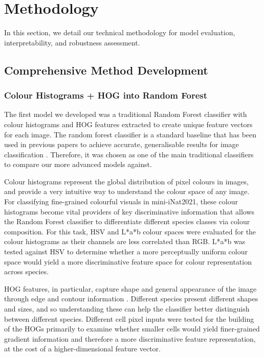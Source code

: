 \section{Methodology}
\label{sec:methods}

In this section, we detail our technical methodology for model evaluation, interpretability, and robustness assessment.

\subsection{Comprehensive Method Development}
\label{sec:comp-method}

\subsubsection{Colour Histograms + HOG into Random Forest}
The first model we developed was a traditional Random Forest classifier with colour histograms and HOG features extracted to create unique feature vectors for each image. The random forest classifier is a standard baseline that has been used in previous papers to achieve accurate, generalisable results for image classification \cite{singh2018improved}. Therefore, it was chosen as one of the main traditional classifiers to compare our more advanced models against.

Colour histograms represent the global distribution of pixel colours in images, and provide a very intuitive way to understand the colour space of any image. For classifying fine-grained colourful visuals in mini-iNat2021, these colour histograms become vital providers of key discriminative information that allows the Random Forest classifier to differentiate different species classes via colour composition. For this task, HSV and L*a*b colour spaces were evaluated for the colour histograms as their channels are less
correlated than RGB. L*a*b was tested against HSV to determine whether a more perceptually uniform colour space would yield a more discriminative feature space for colour representation across species.

HOG features, in particular, capture shape and general appearance of the image through edge and contour information \cite{sen2026featureengineering}. Different species present different shapes and sizes, and so understanding these can help the classifier better distinguish between different species. Different cell pixel inputs were tested for the building of the HOGs primarily to examine whether smaller cells would yield finer-grained gradient information and therefore a more discriminative feature representation,
at the cost of a higher-dimensional feature vector.

